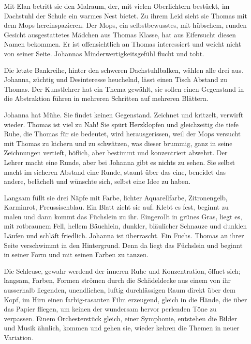 \documentclass[10pt,titlepage,a5paper]{book}
\begin{document}
Mit Elan betritt sie den Malraum, der, mit vielen Oberlichtern bestückt, im Dachstuhl der Schule ein warmes Nest bietet. Zu ihrem Leid sieht sie Thomas mit dem Mops hereinspazieren. Der Mops, ein selbstbewusstes, mit hübschem, runden Gesicht ausgestattetes Mädchen aus Thomas Klasse, hat aus Eifersucht diesen Namen bekommen. Er ist offensichtlich an Thomas interessiert und weicht nicht von seiner Seite. Johannas Minderwertigkeitsgefühl flucht und tobt.

Die letzte Bankreihe, hinter den schweren Dachstuhlbalken, wählen alle drei aus. Johanna, züchtig und Desinteresse heuchelnd, lässt einen Tisch Abstand zu Thomas. Der Kunstlehrer hat ein Thema gewählt, sie sollen einen Gegenstand in die Abstraktion führen in mehreren Schritten auf mehreren Blättern.

Johanna hat Mühe. Sie findet keinen Gegenstand. Zeichnet und kritzelt, verwirft wieder. Thomas ist viel zu Nah! Sie spürt Herzklopfen und gleichzeitig die tiefe Ruhe, die Thomas für sie bedeutet, wird herausgerissen, weil der Mops versucht mit Thomas zu kichern und zu schwätzen, was dieser brummig, ganz in seine Zeichnungen vertieft, höflich, aber bestimmt und konzentriert abwehrt. Der Lehrer macht eine Runde, aber bei Johanna gibt es nichts zu sehen. Sie selbst macht im sicheren Abstand eine Runde, staunt über das eine, beneidet das andere, belächelt und wünschte sich, selbst eine Idee zu haben.

Langsam füllt sie drei  Näpfe mit Farbe, lichter Aquarellfarbe, Zitronengelb, Karminrot, Preussischblau. Ein Blatt zieht sie auf. Klebt es fest, beginnt zu malen und dann kommt das Füchslein zu ihr. Eingerollt in grünes Gras, liegt es, mit rotbraunem Fell, hellem Bäuchlein, dunkler, bläulicher Schnauze und dunklen Läufen und schläft friedlich. Johanna ist überrascht. Ein Fuchs. Thomas an ihrer Seite verschwimmt in den Hintergrund. Denn da liegt das Füchslein und beginnt in seiner  Form und mit seinen Farben zu tanzen.

Die Schleuse, gewahr werdend der inneren Ruhe und Konzentration, öffnet sich; langsam, Farben, Formen strömen durch die Schädeldecke aus einem von ihr ausserhalb liegenden, unendlichen, luftig durchlässigen Raum direkt über dem Kopf, im Hirn einen farbig-rasanten Film erzeugend, gleich in die Hände, die über das Papier fliegen, um keinen der wundersam hervor perlenden Töne zu verpassen. Einem Orchesterstück gleich, einer Symphonie, entstehen die Bilder und Musik ähnlich, kommen und gehen sie, wieder kehren die Themen in neuer Variation.
\end{document}
